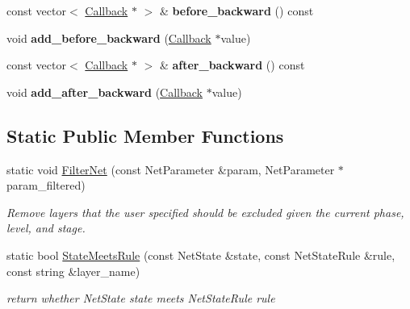 \begin{DoxyCompactItemize}
\item 
const vector$<$ \hyperlink{classcaffe_1_1Net_1_1Callback}{Callback} $\ast$ $>$ \& {\bfseries before\+\_\+backward} () const \hypertarget{classcaffe_1_1Net_a808b5f7a6cdb81e38acda2ac87336303}{}\label{classcaffe_1_1Net_a808b5f7a6cdb81e38acda2ac87336303}

\item 
void {\bfseries add\+\_\+before\+\_\+backward} (\hyperlink{classcaffe_1_1Net_1_1Callback}{Callback} $\ast$value)\hypertarget{classcaffe_1_1Net_aed8cfa1dd96bef7fc39c232623995687}{}\label{classcaffe_1_1Net_aed8cfa1dd96bef7fc39c232623995687}

\item 
const vector$<$ \hyperlink{classcaffe_1_1Net_1_1Callback}{Callback} $\ast$ $>$ \& {\bfseries after\+\_\+backward} () const \hypertarget{classcaffe_1_1Net_aad7f71a02f977a22f73e81bfe894f067}{}\label{classcaffe_1_1Net_aad7f71a02f977a22f73e81bfe894f067}

\item 
void {\bfseries add\+\_\+after\+\_\+backward} (\hyperlink{classcaffe_1_1Net_1_1Callback}{Callback} $\ast$value)\hypertarget{classcaffe_1_1Net_a29a94f00de415c11ee57b0985c255827}{}\label{classcaffe_1_1Net_a29a94f00de415c11ee57b0985c255827}

\end{DoxyCompactItemize}
\subsection*{Static Public Member Functions}
\begin{DoxyCompactItemize}
\item 
static void \hyperlink{classcaffe_1_1Net_a4a38a77b5f01ba4754e6007b9f1214f8}{Filter\+Net} (const Net\+Parameter \&param, Net\+Parameter $\ast$param\+\_\+filtered)\hypertarget{classcaffe_1_1Net_a4a38a77b5f01ba4754e6007b9f1214f8}{}\label{classcaffe_1_1Net_a4a38a77b5f01ba4754e6007b9f1214f8}

\begin{DoxyCompactList}\small\item\em Remove layers that the user specified should be excluded given the current phase, level, and stage. \end{DoxyCompactList}\item 
static bool \hyperlink{classcaffe_1_1Net_a54e8c43fe3a0cd9bbbcfdefd2b1603d2}{State\+Meets\+Rule} (const Net\+State \&state, const Net\+State\+Rule \&rule, const string \&layer\+\_\+name)\hypertarget{classcaffe_1_1Net_a54e8c43fe3a0cd9bbbcfdefd2b1603d2}{}\label{classcaffe_1_1Net_a54e8c43fe3a0cd9bbbcfdefd2b1603d2}

\begin{DoxyCompactList}\small\item\em return whether Net\+State state meets Net\+State\+Rule rule \end{DoxyCompactList}\end{DoxyCompactItemize}

